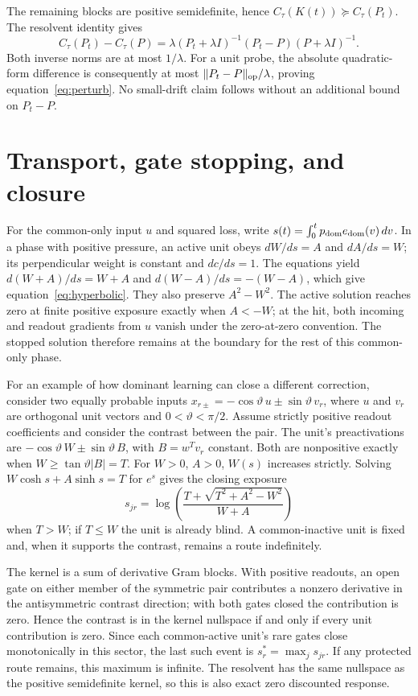 \documentclass[11pt,a4paper]{article}
\begin{document}
The remaining blocks are positive semidefinite, hence $C_\tau(K(t))\succeq C_\tau(P_t)$. The resolvent identity gives
\[
 C_\tau(P_t)-C_\tau(P)
 =\lambda(P_t+\lambda I)^{-1}(P_t-P)(P+\lambda I)^{-1}.
\]
Both inverse norms are at most $1/\lambda$. For a unit probe, the absolute quadratic-form difference is consequently at most $\|P_t-P\|_{\rm op}/\lambda$, proving equation~\eqref{eq:perturb}. No small-drift claim follows without an additional bound on $P_t-P$.

\section{Transport, gate stopping, and closure}\label{app:flow}
For the common-only input $u$ and squared loss, write $s(t)=\int_0^t p_{\rm dom}e_{\rm dom}(v)\,dv$. In a phase with positive pressure, an active unit obeys $dW/ds=A$ and $dA/ds=W$; its perpendicular weight is constant and $dc/ds=1$. The equations yield $d(W+A)/ds=W+A$ and $d(W-A)/ds=-(W-A)$, which give equation~\eqref{eq:hyperbolic}. They also preserve $A^2-W^2$. The active solution reaches zero at finite positive exposure exactly when $A<-W$; at the hit, both incoming and readout gradients from $u$ vanish under the zero-at-zero convention. The stopped solution therefore remains at the boundary for the rest of this common-only phase.

For an example of how dominant learning can close a different correction, consider two equally probable inputs $x_{r\pm}=-\cos\vartheta\,u\pm\sin\vartheta\,v_r$, where $u$ and $v_r$ are orthogonal unit vectors and $0<\vartheta<\pi/2$. Assume strictly positive readout coefficients and consider the contrast between the pair. The unit's preactivations are $-\cos\vartheta\,W\pm\sin\vartheta\,B$, with $B=w^Tv_r$ constant. Both are nonpositive exactly when $W\ge\tan\vartheta|B|=T$. For $W>0$, $A>0$, $W(s)$ increases strictly. Solving $W\cosh s+A\sinh s=T$ for $e^s$ gives the closing exposure
\begin{equation}
 s_{jr}=\log\!\left(\frac{T+\sqrt{T^2+A^2-W^2}}{W+A}\right)
 \label{eq:closing}
\end{equation}
when $T>W$; if $T\le W$ the unit is already blind. A common-inactive unit is fixed and, when it supports the contrast, remains a route indefinitely.

The kernel is a sum of derivative Gram blocks. With positive readouts, an open gate on either member of the symmetric pair contributes a nonzero derivative in the antisymmetric contrast direction; with both gates closed the contribution is zero. Hence the contrast is in the kernel nullspace if and only if every unit contribution is zero. Since each common-active unit's rare gates close monotonically in this sector, the last such event is $s_r^*=\max_j s_{jr}$. If any protected route remains, this maximum is infinite. The resolvent has the same nullspace as the positive semidefinite kernel, so this is also exact zero discounted response.
\end{document}
